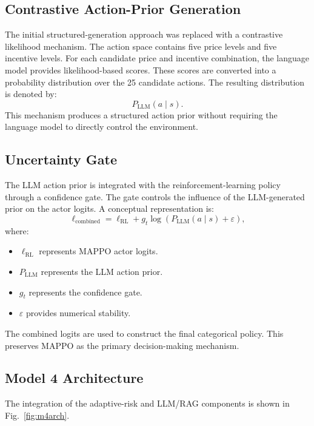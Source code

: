 \documentclass[conference]{IEEEtran}
\begin{document}
\subsection{Contrastive Action-Prior Generation}
The initial structured-generation approach was replaced with a contrastive likelihood mechanism. The action space contains five price levels and five incentive levels. For each candidate price and incentive combination, the language model provides likelihood-based scores. These scores are converted into a probability distribution over the 25 candidate actions. The resulting distribution is denoted by:
\begin{equation}
  P_{\mathrm{LLM}}(a \mid s).
\end{equation}
This mechanism produces a structured action prior without requiring the language model to directly control the environment.

\subsection{Uncertainty Gate}
The LLM action prior is integrated with the reinforcement-learning policy through a confidence gate. The gate controls the influence of the LLM-generated prior on the actor logits. A conceptual representation is:
\begin{equation}
  \ell_{\mathrm{combined}} = \ell_{\mathrm{RL}} + g_t \log\left(P_{\mathrm{LLM}}(a \mid s) + \varepsilon\right),
\end{equation}
where:
\begin{itemize}
  \item $\ell_{\mathrm{RL}}$ represents MAPPO actor logits.
  \item $P_{\mathrm{LLM}}$ represents the LLM action prior.
  \item $g_t$ represents the confidence gate.
  \item $\varepsilon$ provides numerical stability.
\end{itemize}
The combined logits are used to construct the final categorical policy. This preserves MAPPO as the primary decision-making mechanism.

\subsection{Model 4 Architecture}
The integration of the adaptive-risk and LLM/RAG components is shown in Fig.~\ref{fig:m4arch}.
\end{document}
